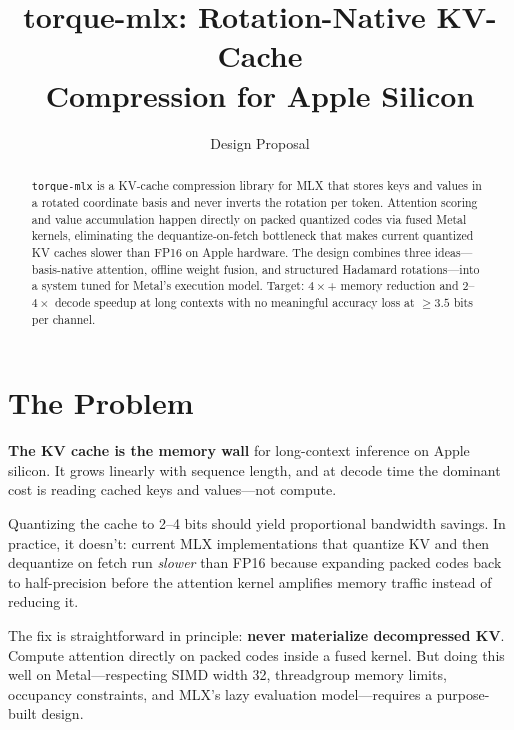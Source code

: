 \documentclass[nobib]{tufte-handout}
\title{torque-mlx: Rotation-Native KV-Cache\\Compression for Apple Silicon}
\author{Design Proposal}
\date{}
\begin{document}
\maketitle

\begin{abstract}
\noindent \texttt{torque-mlx} is a KV-cache compression library for MLX that stores keys and values in a rotated coordinate basis and never inverts the rotation per token. Attention scoring and value accumulation happen directly on packed quantized codes via fused Metal kernels, eliminating the dequantize-on-fetch bottleneck that makes current quantized KV caches slower than FP16 on Apple hardware. The design combines three ideas---basis-native attention, offline weight fusion, and structured Hadamard rotations---into a system tuned for Metal's execution model. Target: $4\times$+ memory reduction and $2$--$4\times$ decode speedup at long contexts with no meaningful accuracy loss at ${\ge}3.5$ bits per channel.
\end{abstract}

\section{The Problem}

\textbf{The KV cache is the memory wall} for long-context inference on Apple silicon. It grows linearly with sequence length, and at decode time the dominant cost is reading cached keys and values---not compute.

Quantizing the cache to 2--4 bits should yield proportional bandwidth savings. In practice, it doesn't: current MLX implementations that quantize KV and then dequantize on fetch run \emph{slower} than FP16 because expanding packed codes back to half-precision before the attention kernel amplifies memory traffic instead of reducing it.

The fix is straightforward in principle: \textbf{never materialize decompressed KV}. Compute attention directly on packed codes inside a fused kernel. But doing this well on Metal---respecting SIMD width 32, threadgroup memory limits, occupancy constraints, and MLX's lazy evaluation model---requires a purpose-built design.
\end{document}
